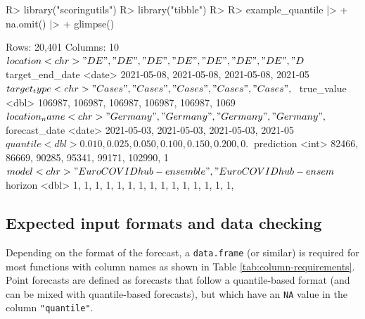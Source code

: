 \documentclass[
]{jss}
\begin{document}
\begin{CodeChunk}
\begin{CodeInput}
R> library("scoringutils")
R> library("tibble")
R>
R> example_quantile |>
+   na.omit() |>
+   glimpse()
\end{CodeInput}
\begin{CodeOutput}
Rows: 20,401
Columns: 10
$ location        <chr> "DE", "DE", "DE", "DE", "DE", "DE", "DE", "D~
$ target_end_date <date> 2021-05-08, 2021-05-08, 2021-05-08, 2021-05~
$ target_type     <chr> "Cases", "Cases", "Cases", "Cases", "Cases",~
$ true_value      <dbl> 106987, 106987, 106987, 106987, 106987, 1069~
$ location_name   <chr> "Germany", "Germany", "Germany", "Germany", ~
$ forecast_date   <date> 2021-05-03, 2021-05-03, 2021-05-03, 2021-05~
$ quantile        <dbl> 0.010, 0.025, 0.050, 0.100, 0.150, 0.200, 0.~
$ prediction      <int> 82466, 86669, 90285, 95341, 99171, 102990, 1~
$ model           <chr> "EuroCOVIDhub-ensemble", "EuroCOVIDhub-ensem~
$ horizon         <dbl> 1, 1, 1, 1, 1, 1, 1, 1, 1, 1, 1, 1, 1, 1, 1,~
\end{CodeOutput}
\end{CodeChunk}

\nocite{tibble} \nocite{kableExtra}

\hypertarget{expected-input-formats-and-data-checking}{%
\subsection{Expected input formats and data
checking}\label{expected-input-formats-and-data-checking}}

Depending on the format of the forecast, a \texttt{data.frame} (or
similar) is required for most functions with column names as shown in
Table \ref{tab:column-requirements}. Point forecasts are defined as
forecasts that follow a quantile-based format (and can be mixed with
quantile-based forecasts), but which have an \texttt{NA} value in the
column \texttt{"quantile"}.
\end{document}

